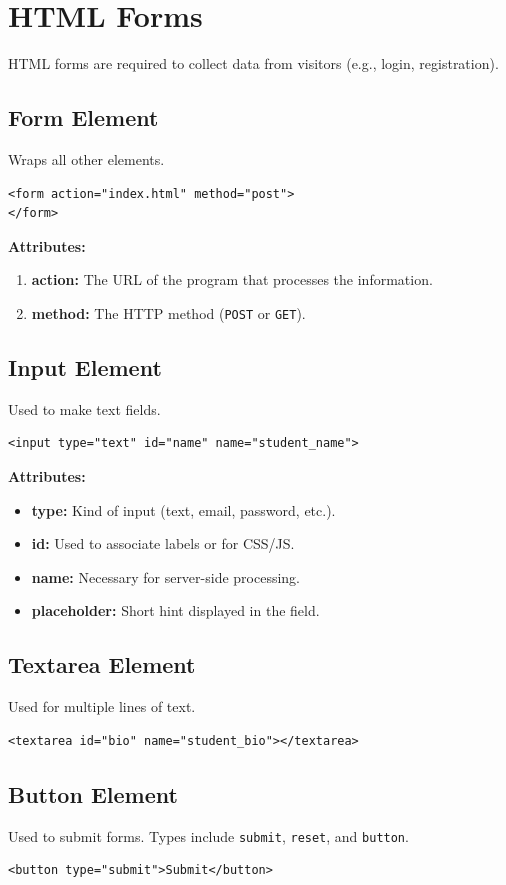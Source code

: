 \documentclass[12pt,a4paper]{article}
\begin{document}
\section*{HTML Forms}
HTML forms are required to collect data from visitors (e.g., login, registration).

\subsection*{Form Element}
Wraps all other elements.
\begin{verbatim}
<form action="index.html" method="post">
</form>
\end{verbatim}

\textbf{Attributes:}
\begin{enumerate}
    \item \textbf{action:} The URL of the program that processes the information.
    \item \textbf{method:} The HTTP method (\texttt{POST} or \texttt{GET}).
\end{enumerate}

\subsection*{Input Element}
Used to make text fields.
\begin{verbatim}
<input type="text" id="name" name="student_name">
\end{verbatim}

\textbf{Attributes:}
\begin{itemize}
    \item \textbf{type:} Kind of input (text, email, password, etc.).
    \item \textbf{id:} Used to associate labels or for CSS/JS.
    \item \textbf{name:} Necessary for server-side processing.
    \item \textbf{placeholder:} Short hint displayed in the field.
\end{itemize}

\subsection*{Textarea Element}
Used for multiple lines of text.
\begin{verbatim}
<textarea id="bio" name="student_bio"></textarea>
\end{verbatim}

\subsection*{Button Element}
Used to submit forms. Types include \texttt{submit}, \texttt{reset}, and \texttt{button}.
\begin{verbatim}
<button type="submit">Submit</button>
\end{verbatim}
\end{document}
